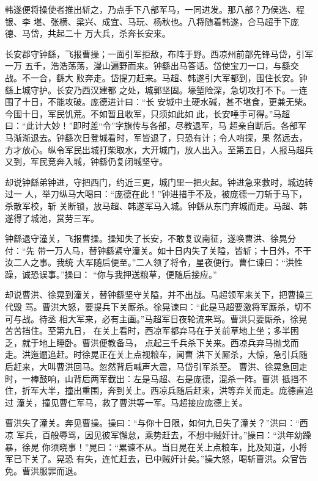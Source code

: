 韩遂便将操使者推出斩之，乃点手下八部军马，一同进发。那八部？乃侯选、程银、李
堪、张横、梁兴、成宜、马玩、杨秋也。八将随着韩遂，合马超手下庞德、马岱，共起二十
万大兵，杀奔长安来。

长安郡守钟繇，飞报曹操；一面引军拒敌，布阵于野。西凉州前部先锋马岱，引军一万
五千，浩浩荡荡，漫山遍野而来。钟繇出马答话。岱使宝刀一口，与繇交战。不一合，繇大
败奔走。岱提刀赶来。马超、韩遂引大军都到，围住长安。钟繇上城守护。长安乃西汉建都
之处，城郭坚固。壕堑险深，急切攻打不下。一连围了十日，不能攻破。庞德进计曰：“长
安城中土硬水碱，甚不堪食，更兼无柴。今围十日，军民饥荒。不如暂且收军，只须如此如
此，长安唾手可得。”马超曰：“此计大妙！”即时差“令”字旗传与各部，尽教退军，马
超亲自断后。各部军马渐渐退去。钟繇次日登城看时，军皆退了，只恐有计；令人哨探，果
然远去，方才放心。纵令军民出城打柴取水，大开城门，放人出入。至第五日，人报马超兵
又到，军民竞奔入城，钟繇仍复闭城坚守。

却说钟繇弟钟进，守把西门，约近三更，城门里一把火起。钟进急来救时，城边转过一
人，举刀纵马大喝曰：“庞德在此！”钟进措手不及，被庞德一刀斩于马下，杀散军校，斩
关断锁，放马超、韩遂军马入城。钟繇从东门弃城而走。马超、韩遂得了城池，赏劳三军。

钟繇退守潼关，飞报曹操。操知失了长安，不敢复议南征，遂唤曹洪、徐晃分付：“先
带一万人马，替钟繇紧守潼关。如十日内失了关隘，皆斩；十日外，不干汝二人之事。我统
大军随后便至。”二人领了将令，星夜便行。曹仁谏曰：“洪性躁，诚恐误事。”操曰：
“你与我押送粮草，便随后接应。”

却说曹洪、徐晃到潼关，替钟繇坚守关隘，并不出战。马超领军来关下，把曹操三代毁
骂。曹洪大怒，要提兵下关厮杀。徐晃谏曰：“此是马超要激将军厮杀，切不可与战。待丞
相大军来，必有主画。”马超军日夜轮流来骂。曹洪只要厮杀，徐晃苦苦挡住。至第九日，
在关上看时，西凉军都弃马在于关前草地上坐；多半困乏，就于地上睡卧。曹洪便教备马，
点起三千兵杀下关来。西凉兵弃马抛戈而走。洪迤逦追赶。时徐晃正在关上点视粮车，闻曹
洪下关厮杀，大惊，急引兵随后赶来，大叫曹洪回马。忽然背后喊声大震，马岱引军杀至。
曹洪、徐晃急回走时，一棒鼓响，山背后两军截出：左是马超、右是庞德，混杀一阵。曹洪
抵挡不住，折军大半，撞出重围，奔到关上。西凉兵随后赶来，洪等弃关而走。庞德直追过
潼关，撞见曹仁军马，救了曹洪等一军。马超接应庞德上关。

曹洪失了潼关。奔见曹操。操曰：“与你十日限，如何九日失了潼关？”洪曰：“西凉
军兵，百般辱骂，因见彼军懈怠，乘势赶去，不想中贼奸计。”操曰：“洪年幼躁暴，徐晃
你须晓事！”晃曰：“累谏不从。当日晃在关上点粮车，比及知道，小将军已下关了。晃恐
有失，连忙赶去，已中贼奸计矣。”操大怒，喝斩曹洪。众官告免。曹洪服罪而退。

